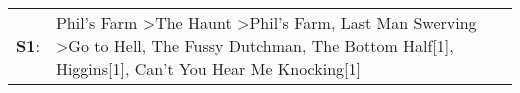 \begin{supertabular}{p{0.03\textwidth}p{0.92\textwidth}}
 \textbf{S1}:  &  Phil's Farm\textsuperscript{} \textgreater \enspace The Haunt\textsuperscript{} \textgreater \enspace Phil's Farm\textsuperscript{}, \enspace Last Man Swerving\textsuperscript{} \textgreater \enspace Go to Hell\textsuperscript{}, \enspace The Fussy Dutchman\textsuperscript{}, \enspace The Bottom Half[1]\textsuperscript{}, \enspace Higgins[1]\textsuperscript{}, \enspace Can't You Hear Me Knocking[1]\textsuperscript{}  \enspace  \\
\end{supertabular}

